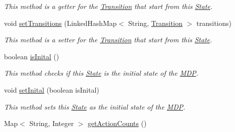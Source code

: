\begin{DoxyCompactItemize}
\begin{DoxyCompactList}\small\item\em This method is a getter for the \hyperlink{classese_1_1seas_1_1upenn_1_1edu_1_1_transition}{Transition} that start from this \hyperlink{classese_1_1seas_1_1upenn_1_1edu_1_1_state}{State}. \end{DoxyCompactList}\item 
\hypertarget{classese_1_1seas_1_1upenn_1_1edu_1_1_state_a408bdbf6b39b1bba4be3e546a0673d98}{}void \hyperlink{classese_1_1seas_1_1upenn_1_1edu_1_1_state_a408bdbf6b39b1bba4be3e546a0673d98}{set\+Transitions} (Linked\+Hash\+Map$<$ String, \hyperlink{classese_1_1seas_1_1upenn_1_1edu_1_1_transition}{Transition} $>$ transitions)\label{classese_1_1seas_1_1upenn_1_1edu_1_1_state_a408bdbf6b39b1bba4be3e546a0673d98}

\begin{DoxyCompactList}\small\item\em This method is a setter for the \hyperlink{classese_1_1seas_1_1upenn_1_1edu_1_1_transition}{Transition} that start from this \hyperlink{classese_1_1seas_1_1upenn_1_1edu_1_1_state}{State}. \end{DoxyCompactList}\item 
\hypertarget{classese_1_1seas_1_1upenn_1_1edu_1_1_state_a79165c8a0e7d44b24de8d7bfcf9946a7}{}boolean \hyperlink{classese_1_1seas_1_1upenn_1_1edu_1_1_state_a79165c8a0e7d44b24de8d7bfcf9946a7}{is\+Inital} ()\label{classese_1_1seas_1_1upenn_1_1edu_1_1_state_a79165c8a0e7d44b24de8d7bfcf9946a7}

\begin{DoxyCompactList}\small\item\em This method checks if this \hyperlink{classese_1_1seas_1_1upenn_1_1edu_1_1_state}{State} is the initial state of the \hyperlink{classese_1_1seas_1_1upenn_1_1edu_1_1_m_d_p}{M\+D\+P}. \end{DoxyCompactList}\item 
\hypertarget{classese_1_1seas_1_1upenn_1_1edu_1_1_state_a1d21608fbd6ac74fdc3c052b205d5a24}{}void \hyperlink{classese_1_1seas_1_1upenn_1_1edu_1_1_state_a1d21608fbd6ac74fdc3c052b205d5a24}{set\+Inital} (boolean is\+Inital)\label{classese_1_1seas_1_1upenn_1_1edu_1_1_state_a1d21608fbd6ac74fdc3c052b205d5a24}

\begin{DoxyCompactList}\small\item\em This method sets this \hyperlink{classese_1_1seas_1_1upenn_1_1edu_1_1_state}{State} as the initial state of the \hyperlink{classese_1_1seas_1_1upenn_1_1edu_1_1_m_d_p}{M\+D\+P}. \end{DoxyCompactList}\item 
\hypertarget{classese_1_1seas_1_1upenn_1_1edu_1_1_state_a5cab4a963a7af4b95809de7fa106d02c}{}Map$<$ String, Integer $>$ \hyperlink{classese_1_1seas_1_1upenn_1_1edu_1_1_state_a5cab4a963a7af4b95809de7fa106d02c}{get\+Action\+Counts} ()\label{classese_1_1seas_1_1upenn_1_1edu_1_1_state_a5cab4a963a7af4b95809de7fa106d02c}


\end{DoxyCompactItemize}
